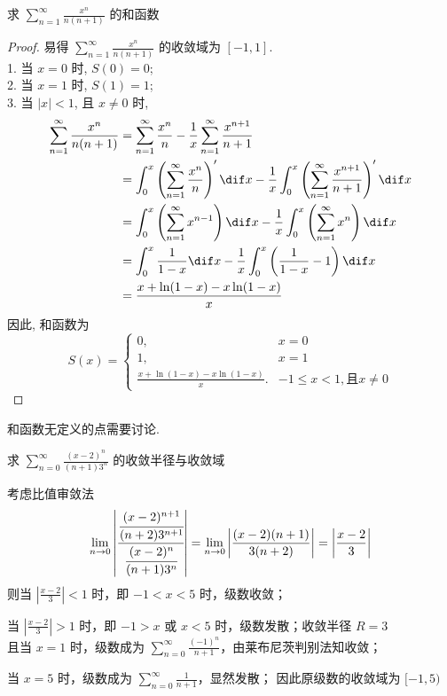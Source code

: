 \documentclass[color=green,titlestyle=hang]{elegantbook}%
\begin{document}
\begin{example}
求 $\sum_{n=1}^{\infty}\frac{x^n}{n(n+1)}$ 的和函数
\end{example}\begin{proof}
易得 $\sum_{n=1}^{\infty}\frac{x^n}{n(n+1)}$ 的收敛域为 $[-1,1]$.\\
1. 当 $x=0$ 时, $S(0)=0$;\\
2. 当 $x=1$ 时, $S(1)=1$;\\
3. 当 $|x|<1$, 且 $x\neq0$ 时,
\begin{align*}
\sum_{n=1}^{\infty}\frac{x^n}{n(n+1)}
&=\sum_{n=1}^{\infty}\frac{x^n}{n}-\frac{1}{x}\sum_{n=1}^{\infty}\frac{x^{n+1}}{n+1}\\
&=\int_0^x\left(\sum_{n=1}^{\infty}\frac{x^n}{n}\right)'\dif x-\frac{1}{x}\int_0^x\left(\sum_{n=1}^{\infty}\frac{x^{n+1}}{n+1}\right)'\dif x\\
&=\int_0^x\left(\sum_{n=1}^{\infty}x^{n-1}\right)\dif x-\frac{1}{x}\int_0^x\left(\sum_{n=1}^{\infty}x^{n}\right)\dif x\\
&=\int_0^x\frac{1}{1-x}\dif x-\frac{1}{x}\int_0^x\left(\frac{1}{1-x}-1\right)\dif x\\
&=\frac{x+\ln(1-x)-x\ln(1-x)}{x}
\end{align*}
因此, 和函数为\[S(x)=\begin{cases}
0,& x=0\\
1,& x=1\\
\frac{x+\ln(1-x)-x\ln(1-x)}{x}.& -1\leqslant x<1, \text{且}x\neq0
\end{cases}\]
\end{proof}\begin{note}
和函数无定义的点需要讨论.
\end{note}

\begin{example}
求 $\sum_{n=0}^{\infty}\frac{(x-2)^n}{(n+1)3^n}$ 的收敛半径与收敛域	
\end{example}\begin{Solution}考虑比值审敛法
\[\lim_{n\to0}\left|\cfrac{\cfrac{(x-2)^{n+1}}{(n+2)3^{n+1}}}{\cfrac{(x-2)^n}{(n+1)3^n}}\right|=\lim_{n\to0}\left|\frac{(x-2)(n+1)}{3(n+2)}\right|=\left|\frac{x-2}{3}\right|\]
则当 $\left|\frac{x-2}{3}\right|<1$ 时，即 $-1<x<5$ 时，级数收敛；\\
\par\setlength{\parindent}{1em}当 $\left|\frac{x-2}{3}\right|>1$ 时，即 $-1>x$ 或 $x<5$ 时，级数发散；{\color{red}收敛半径 $R=3$}\\
且当  $x=1$ 时，级数成为 $\sum_{n=0}^{\infty}\frac{(-1)^n}{n+1}$，由莱布尼茨判别法知收敛；\\
\par 当  $x=5$ 时，级数成为 $\sum_{n=0}^{\infty}\frac{1}{n+1}$，显然发散；
因此原级数的{\color{red}收敛域为 $[-1,5)$}	
\end{Solution}
\end{document}
